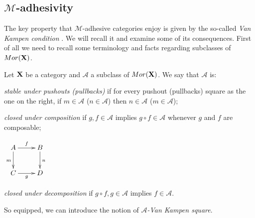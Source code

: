 \documentclass[a4paper,UKenglish,cleveref,pdftex, thm-restate,numberwithinsect]{lipics}
\newcommand{\mor}{\mathsf{Mor}}
\def\X{\textbf {\textup{X}}}
\newcommand{\rem}[2]{{\color{blue}#1}{\color{red}#2}}
\renewcommand{\rem}[2]{}
\begin{document}
\subsection{$\mathcal{M}$-adhesivity}
The key property that $\mathcal{M}$-adhesive categories enjoy is given by  the so-called \emph{Van Kampen condition} \cite{brown1997van,johnstone2007quasitoposes,lack2005adhesive}. We will recall it and examine some of its consequences. First of all we need to recall some terminology and facts regarding subclasses of $\mor(\X)$.

\begin{definition}
	Let $\X$ be a category and $\mathcal{A}$ a  subclass of $\mor(\X)$. We say that  $\mathcal{A}$ is:
	\begin{itemize}
		\parbox{11cm}{\item 
		\emph{stable under pushouts (pullbacks)} if for every pushout (pullbacks) square as the one on the right, 	if $m \in \mathcal{A}$ ($n\in \mathcal{A}$) then $n \in \mathcal{A}$ ($m \in \mathcal{A}$);
			\item \emph{closed under composition} if $g, f\in \mathcal{A}$ implies $g\circ f\in \mathcal{A}$ whenever $g$ and $f$ are composable; }\hfill
		\parbox{2cm}{$\xymatrix{A\ar[r]^f  \ar[d]_{m}& B \ar[d]^n \\ C \ar[r]_g & D}$}
		\parbox{11cm}{}\hfill 
	
	
	
		\item \emph{closed under decomposition} if $g\circ f, g\in \mathcal{A}$ implies $f\in \mathcal{A}$.
	\end{itemize}
\end{definition}

\rem{rimuoverei}{
\begin{remark}
  In the previous definition, ``decomposition'' corresponds to
  ``left cancellation'', but we prefer to stick to the name commonly
  used in literature (see e.g.~\cite{habel2012mathcal}).
\end{remark}
}

So equipped, we can introduce the notion of \emph{$\mathcal{A}$-Van Kampen square}.
\end{document}
